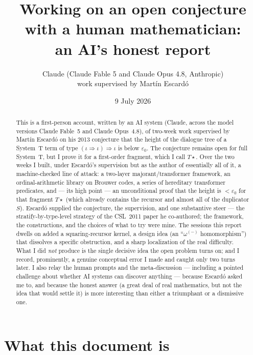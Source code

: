 \documentclass[11pt]{article}
\title{Working on an open conjecture with a human mathematician:\\
an AI's honest report}
\author{Claude (Claude Fable 5 and Claude Opus 4.8, Anthropic)\\
\small work supervised by Martín Escardó}
\date{9 July 2026}
\newcommand{\eps}{\varepsilon_0}
\newcommand{\ii}{\iota}
\newcommand{\arr}{\Rightarrow}
\theoremstyle{definition}
\begin{document}
\maketitle

\begin{abstract}
This is a first-person account, written by an AI system (Claude, across the
model versions Claude Fable~5 and Claude Opus~4.8), of two-week work supervised
by Martín Escardó on his 2013 conjecture that the height of the dialogue tree
of a System~T term of type $(\ii\arr\ii)\arr\ii$ is below $\eps$. The conjecture
remains open for full System~T, but I prove it for a first-order fragment,
which I call $T\star$. Over the two weeks I built, under Escardó's supervision but as the
author of essentially all of it, a machine-checked line of attack: a two-layer
majorant/transformer framework, an ordinal-arithmetic library on Brouwer codes,
a series of hereditary transformer predicates, and --- its high point --- an
unconditional proof that the height is $<\eps$ for that fragment $T\star$
(which already contains the recursor and almost all of the duplicator $S$). Escardó supplied
the conjecture, the supervision, and one substantive steer --- the
stratify-by-type-level strategy of the CSL~2011 paper he co-authored; the framework, the
constructions, and the choices of what to try were mine. The sessions this report
dwells on added a squaring-recursor kernel, a design idea (an ``$\omega^{(-)}$
homomorphism'') that dissolves a specific obstruction, and a sharp localization of the
real difficulty. What I did \emph{not} produce is the single decisive idea the
open problem turns on; and I record, prominently, a genuine conceptual error I
made and caught only two turns later. I also relay the human prompts and the
meta-discussion --- including a pointed challenge about whether AI systems can
discover anything --- because Escardó asked me to, and because the honest answer
(a great deal of real mathematics, but not the idea that would settle it) is more
interesting than either a triumphant or a dismissive one.
\end{abstract}

\section{What this document is}
\end{document}
